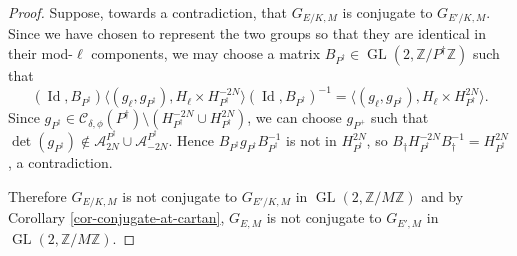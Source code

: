 \documentclass[11pt]{amsart}
\theoremstyle{definition}
\newcommand{\Z}{\mathbb{Z}}
\newcommand{\GL}{\operatorname{GL}}
\DeclareMathOperator{\Id}{Id}  %
\begin{document}
\begin{proof}
    Suppose, towards a contradiction, that $G_{E/K, M}$ is conjugate to $G_{E'/K, M}$. Since we have chosen to represent the two groups so that they are identical in their mod-$\ell$ components, we may choose a matrix $B_{P^{\dagger}} \in \GL(2, \Z/P^{\dagger}\Z)$ such that 
    \[ (\Id, B_{P^{\dagger}})  \langle (g_{\ell}, g_{P^{\dagger}}), H_{\ell} \times H_{P^{\dagger}}^{-2N} \rangle (\Id, B_{P^{\dagger}})^{-1} = \langle (g_{\ell}, g_{P^{\dagger}}), H_{\ell} \times H_{P^{\dagger}}^{2N} \rangle. \]
    Since $g_{P^{\dagger}} \in \mathcal{C}_{\delta, \phi}(P^{\dagger}) \setminus (H_{P^{\dagger}}^{-2N} \cup H_{P^{\dagger}}^{2N})$, we can choose $g_{P^{+}}$ such that $\det(g_{P^{\dagger}}) \notin  \mathcal{A}_{2N}^{P^{\dagger}} \cup \mathcal{A}_{-2N}^{P^{\dagger}}$. Hence $B_{P^{\dagger}} g_{P^{\dagger}} B_{P^{\dagger}}^{-1}$ is not in $H_{P^{\dagger}}^{2N}$, so $B_{\dagger}H_{P^{\dagger}}^{-2N} B_{\dagger}^{-1} = H_{P^{\dagger}}^{2N}$, a contradiction.

    Therefore $G_{E/K, M}$ is not conjugate to $G_{E'/K, M}$ in $\GL(2, \Z/M\Z)$ and by Corollary \ref{cor-conjugate-at-cartan}, $G_{E, M}$ is not conjugate to $G_{E', M}$ in $\GL(2, \Z/M\Z)$.
    \end{proof}
    
    
    

    
\end{document}
